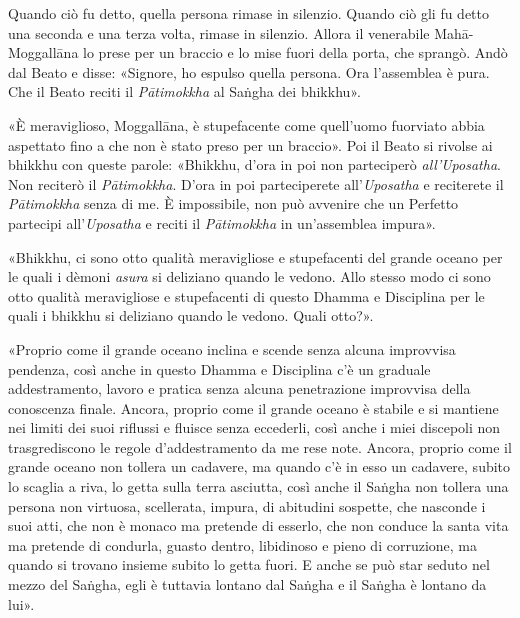 Quando ciò fu detto, quella persona rimase in silenzio. Quando ciò gli fu detto
una seconda e una terza volta, rimase in silenzio. Allora il venerabile
Mahā-Moggallāna lo prese per un braccio e lo mise fuori della porta, che
sprangò. Andò dal Beato e disse: «Signore, ho espulso quella persona. Ora
l’assemblea è pura. Che il Beato reciti il \emph{Pātimokkha} al Saṅgha dei
bhikkhu».

«È meraviglioso, Moggallāna, è stupefacente come quell’uomo fuorviato abbia
aspettato fino a che non è stato preso per un braccio». Poi il Beato si rivolse
ai bhikkhu con queste parole: «Bhikkhu, d’ora in poi non parteciperò
\emph{all’Uposatha}. Non reciterò il \emph{Pātimokkha}. D’ora in poi
parteciperete all’\emph{Uposatha} e reciterete il \emph{Pātimokkha} senza di me.
È impossibile, non può avvenire che un Perfetto partecipi all’\emph{Uposatha} e
reciti il \emph{Pātimokkha} in un’assemblea impura».

«Bhikkhu, ci sono otto qualità meravigliose e stupefacenti del grande oceano per
le quali i dèmoni \emph{asura} si deliziano quando le vedono. Allo stesso modo
ci sono otto qualità meravigliose e stupefacenti di questo Dhamma e Disciplina
per le quali i bhikkhu si deliziano quando le vedono. Quali otto?».

«Proprio come il grande oceano inclina e scende senza alcuna improvvisa
pendenza, così anche in questo Dhamma e Disciplina c’è un graduale
addestramento, lavoro e pratica senza alcuna penetrazione improvvisa della
conoscenza finale. Ancora, proprio come il grande oceano è stabile e si mantiene
nei limiti dei suoi riflussi e fluisce senza eccederli, così anche i miei
discepoli non trasgrediscono le regole d’addestramento da me rese note. Ancora,
proprio come il grande oceano non tollera un cadavere, ma quando c’è in esso un
cadavere, subito lo scaglia a riva, lo getta sulla terra asciutta, così anche il
Saṅgha non tollera una persona non virtuosa, scellerata, impura, di abitudini
sospette, che nasconde i suoi atti, che non è monaco ma pretende di esserlo, che
non conduce la santa vita ma pretende di condurla, guasto dentro, libidinoso e
pieno di corruzione, ma quando si trovano insieme subito lo getta fuori. E anche
se può star seduto nel mezzo del Saṅgha, egli è tuttavia lontano dal Saṅgha e il
Saṅgha è lontano da lui».

